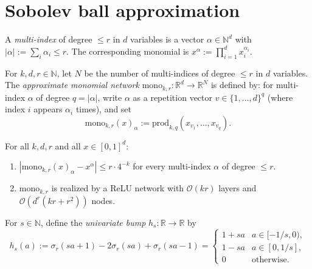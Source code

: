 \section{Sobolev ball approximation}\label{sec:sobolev}

\begin{definition}\label{def:multiIndex}
A \emph{multi-index} of degree $\leq r$ in $d$ variables is a vector
$\alpha \in \mathbb{N}^d$ with $|\alpha| := \sum_i \alpha_i \leq r$.
The corresponding monomial is $x^\alpha := \prod_{i=1}^d x_i^{\alpha_i}$.
\end{definition}

\begin{definition}\label{def:monoApprox}
For $k, d, r \in \mathbb{N}$, let $N$ be the number of multi-indices of degree $\leq r$ in $d$ variables.
The \emph{approximate monomial network} $\mathrm{mono}_{k,r} : \mathbb{R}^d \to \mathbb{R}^N$ is defined by:
for multi-index $\alpha$ of degree $q = |\alpha|$, write $\alpha$ as a repetition vector $v \in \{1,\ldots,d\}^q$
(where index $i$ appears $\alpha_i$ times), and set
\[
  \mathrm{mono}_{k,r}(x)_\alpha := \mathrm{prod}_{k,q}(x_{v_1}, \ldots, x_{v_q}).
\]
\end{definition}

\begin{lemma}\label{lem:monoApprox}
For all $k, d, r$ and all $x \in [0,1]^d$:
\begin{enumerate}
  \item $|\mathrm{mono}_{k,r}(x)_\alpha - x^\alpha| \leq r \cdot 4^{-k}$ for every multi-index $\alpha$ of degree $\leq r$.
  \item $\mathrm{mono}_{k,r}$ is realized by a ReLU network with $\mathcal{O}(kr)$ layers
    and $\mathcal{O}(d^r(kr + r^2))$ nodes.
\end{enumerate}
\end{lemma}

\begin{definition}\label{def:univariateBump}
For $s \in \mathbb{N}$, define the \emph{univariate bump} $h_s : \mathbb{R} \to \mathbb{R}$ by
\[
  h_s(a) := \sigma_r(sa + 1) - 2\sigma_r(sa) + \sigma_r(sa - 1)
  = \begin{cases}
    1 + sa & a \in [-1/s, 0), \\
    1 - sa & a \in [0, 1/s], \\
    0      & \text{otherwise.}
  \end{cases}
\]
\end{definition}

